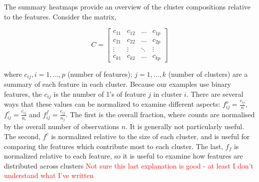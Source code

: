 \documentclass[article]{ajs}
\begin{document}
The summary heatmaps provide an overview of the cluster compositions relative to the features. Consider the matrix,

\[
C = \left[ \begin{array}{cccc} c_{11} & c_{12} & \dots & c_{1p} \\
                                              c_{21} & c_{22} & \dots & c_{2p} \\
                                              \vdots &  \vdots & \ddots &  \vdots \\
                                              c_{k1} & c_{k2} & \dots & c_{kp}
                                              \end{array} \right]
\]

where $c_{ij}, i=1, ..., p$ (number of features); $j=1, ..., k$ (number of clusters) are a summary of each feature in each cluster. Because our examples use binary features,  the $c_{ij}$ is the number of 1's of feature $j$ in cluster $i$. %
There are several ways that these values can be normalized to examine different aspects: $f_{ij}^{o} = \frac{c_{ij}}{n}$, $f_{ij}^{c} = \frac{c_{ij}}{n_{i}}$ and $f_{ij}^{f} = \frac{c_{ij}}{n_{j}}$. The first is the overall fraction, where counts are normalised by the overall number of observations $n$. It is generally not particularly useful. The second, $f^c$ is normalized relative to the size of each cluster, and is useful for comparing the features which contribute most to each cluster. The last, $f_f$ is normalized relative to each feature, so it is useful to examine how features are distributed across clusters \textcolor{red}{Not sure this last explanation is good - at least I don't understand what I've written}


\end{document}
